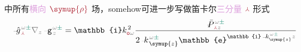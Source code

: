  中所有\textcolor{Plum}{横向} $\textcolor{Maroon}{\symup{\rho}}$ 场，somehow可进一步写做笛卡尔\textcolor{Plum}{三分量} $\textcolor{Maroon}{\Yup}$ 形式
\begin{subequations} \label{eq:simplify8-scalar}
	\begin{align}
		\Xint{{}^{}_{\mathcolor{gray}{-}}}{10}{\hat{g}}^{\;\!\mathcolor{gray}{\omega} \textcolor{PineGreen}{\pm}}_{\;\! \textcolor{Maroon}{\Yup}} \mathcolor{gray}{\nabla_z} \Xint{\begin{smallmatrix} ~ \\ {}^{}_{\mathcolor{gray}{-}} \\ ~ \end{smallmatrix}}{09}{\mathtt{g}}^{\;\!\mathcolor{gray}{\omega} \textcolor{PineGreen}{\pm}}_{\;\! \mathcolor{gray}{z}} &= \mathbb{i} k_{\textcolor{Maroon}{\mathsf{o}} \mathcolor{gray}{\omega}}^{\;\! 2} \frac{\Xint{\mathcolor{gray}{-}}{25}{\bar{P}}^{\;\! \mathcolor{gray}{\omega} \textcolor{PineGreen}{\pm}}_{\;\! \textcolor{Maroon}{\Yup} \mathcolor{gray}{z}}}{2 \Xint{\begin{smallmatrix} ~ \\ {}^{}_{\mathcolor{gray}{-}} \\ ~ \end{smallmatrix}}{15}{k}_{\;\! \symup{z}}^{\;\! \mathcolor{gray}{\omega} \textcolor{PineGreen}{\pm}} \mathbb{e}^{\mathbb{i} \Xint{\begin{smallmatrix} ~ \\ {}^{}_{\mathcolor{gray}{-}} \\ ~ \end{smallmatrix}}{15}{k}_{\symup{z}}^{\;\! \mathcolor{gray}{\omega} \textcolor{PineGreen}{\pm}} \mathcolor{gray}{z}}} \label{eq:simplify8-scalar-g} \\

\end{align}
\end{subequations}
